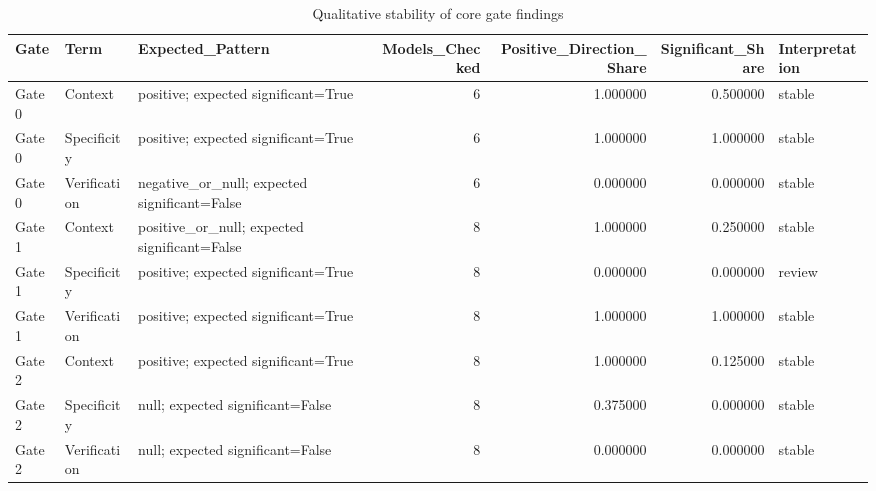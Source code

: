 \begin{table}
\caption{Qualitative stability of core gate findings}
\label{tab:robustness-core-stability}
\begin{tabular}{lllrrrl}
\toprule
Gate & Term & Expected_Pattern & Models_Checked & Positive_Direction_Share & Significant_Share & Interpretation \\
\midrule
Gate 0 & Context & positive; expected significant=True & 6 & 1.000000 & 0.500000 & stable \\
Gate 0 & Specificity & positive; expected significant=True & 6 & 1.000000 & 1.000000 & stable \\
Gate 0 & Verification & negative_or_null; expected significant=False & 6 & 0.000000 & 0.000000 & stable \\
Gate 1 & Context & positive_or_null; expected significant=False & 8 & 1.000000 & 0.250000 & stable \\
Gate 1 & Specificity & positive; expected significant=True & 8 & 0.000000 & 0.000000 & review \\
Gate 1 & Verification & positive; expected significant=True & 8 & 1.000000 & 1.000000 & stable \\
Gate 2 & Context & positive; expected significant=True & 8 & 1.000000 & 0.125000 & stable \\
Gate 2 & Specificity & null; expected significant=False & 8 & 0.375000 & 0.000000 & stable \\
Gate 2 & Verification & null; expected significant=False & 8 & 0.000000 & 0.000000 & stable \\
\bottomrule
\end{tabular}
\end{table}
